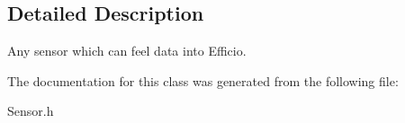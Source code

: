 \subsection{Detailed Description}
Any sensor which can feel data into Efficio. 

The documentation for this class was generated from the following file\+:\begin{DoxyCompactItemize}
\item 
Sensor.\+h\end{DoxyCompactItemize}

